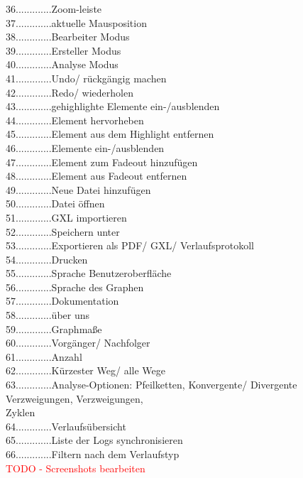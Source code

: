 \documentclass[enabledeprecatedfontcommands,fontsize=11pt,paper=a4,twoside]{scrartcl}
\newcommand*{\red}{\textcolor{red}}
\newcounter{one}
\newcommand*{\hdo}{.............}
\begin{document}
36\hdo Zoom-leiste \\
37\hdo aktuelle Mausposition \\
38\hdo Bearbeiter Modus\\
39\hdo Ersteller Modus\\
40\hdo Analyse Modus\\
41\hdo Undo/ rückgängig machen\\
42\hdo Redo/ wiederholen\\
43\hdo gehighlighte Elemente ein-/ausblenden\\
44\hdo Element hervorheben\\
45\hdo Element aus dem Highlight entfernen\\
46\hdo Elemente ein-/ausblenden\\
47\hdo Element zum Fadeout hinzufügen\\
48\hdo Element aus Fadeout entfernen\\
49\hdo Neue Datei hinzufügen\\
50\hdo Datei öffnen\\
51\hdo GXL importieren\\
52\hdo Speichern unter\\
53\hdo Exportieren als PDF/ GXL/ Verlaufsprotokoll\\
54\hdo Drucken\\
55\hdo Sprache Benutzeroberfläche\\
56\hdo Sprache des Graphen\\
57\hdo Dokumentation\\
58\hdo über uns \\
59\hdo Graphmaße\\
60\hdo Vorgänger/ Nachfolger\\
61\hdo Anzahl\\
62\hdo Kürzester Weg/ alle Wege\\
63\hdo Analyse-Optionen: Pfeilketten, Konvergente/ Divergente Verzweigungen, Verzweigungen,\\ 		
\hspace*{1.7cm} Zyklen\\
64\hdo Verlaufsübersicht\\
65\hdo Liste der Logs synchronisieren\\
66\hdo Filtern nach dem Verlaufstyp\\

\red{TODO - Screenshots bearbeiten}
\end{document}
